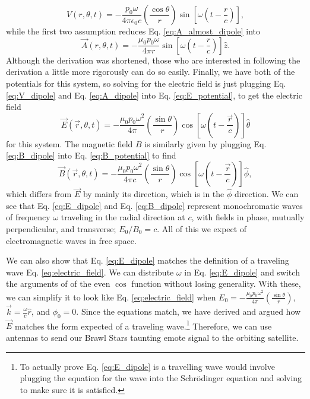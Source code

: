 \documentclass[10pt]{article}
\begin{document}
\begin{equation}
V(r,\theta,t) = -\frac{p_0\omega}{4 \pi \epsilon_0 c}(\frac{\cos\theta}{r})\sin[\omega(t-\frac{r}{c})],
    \label{eq:V_dipole}
\end{equation}
while the first two assumption reduces Eq. \ref{eq:A_almost_dipole} into
\begin{equation}
\vec{A}(r,\theta,t) = -\frac{\mu_0p_0\omega}{4 \pi r}\sin[\omega(t-\frac{r}{c})]\hat{z}.
    \label{eq:A_dipole}
\end{equation}
Although the derivation was shortened, those who are interested in following the derivation a little more rigorously can do so easily\cite{griffiths_2019}.
Finally, we have both of the potentials for this system, so solving for the electric field is just plugging Eq. \ref{eq:V_dipole} and Eq. \ref{eq:A_dipole} into Eq. \ref{eq:E_potential}, to get the electric field
\begin{equation}
\vec{E}(\vec{r},\theta,t) = -\frac{\mu_0p_0\omega^2}{4 \pi}(\frac{\sin\theta}{r})\cos[\omega(t-\frac{\vec{r}}{c})]\hat{\theta}
    \label{eq:E_dipole}
\end{equation}
for this system. The magnetic field $B$ is similarly given by plugging Eq. \ref{eq:B_dipole} into Eq. \ref{eq:B_potential} to find 
\begin{equation}
\vec{B}(\vec{r},\theta,t) = -\frac{\mu_0p_0\omega^2}{4 \pi c}(\frac{\sin\theta}{r})\cos[\omega(t-\frac{\vec{r}}{c})]\hat{\phi},
    \label{eq:B_dipole}
\end{equation}
which differs from $\vec{E}$ by mainly its direction, which is in the $\hat{\phi}$ direction. We can see that Eq. \ref{eq:E_dipole} and Eq. \ref{eq:B_dipole} represent monochromatic waves of frequency $\omega$ traveling in the radial direction at $c$, with fields in phase, mutually perpendicular, and transverse; $E_0/B_0 = c$. All of this we expect of electromagnetic waves in free space\cite{griffiths_2019}.

We can also show that Eq. \ref{eq:E_dipole} matches the definition of a traveling wave Eq. \ref{eq:electric_field}. We can distribute $\omega$ in Eq. \ref{eq:E_dipole} and switch the arguments of of the even $\cos$ function without losing generality. With these, we can simplify it to look like Eq. \ref{eq:electric_field} when $E_0 = -\frac{\mu_0p_0\omega^2}{4 \pi}(\frac{\sin\theta}{r})$, $\vec{k} = \frac{\omega}{c}\hat{r}$, and $\phi_0 = 0$. Since the equations match, we have derived and argued how $\vec{E}$ matches the form expected of a traveling wave.\footnote{To actually prove Eq. \ref{eq:E_dipole} is a travelling wave would involve plugging the equation for the wave into the Schrödinger equation and solving to make sure it is satisfied.} Therefore, we can use antennas to send our Brawl Stars taunting emote signal to the orbiting satellite.
\end{document}
